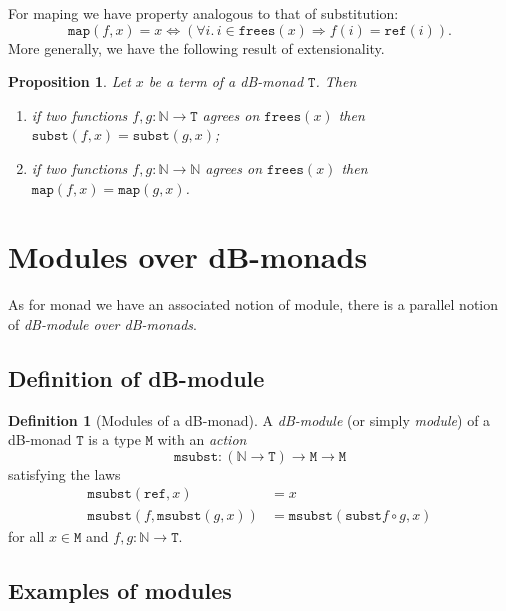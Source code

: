 \documentclass[a4paper,twoside,12pt]{article}
\newtheorem{proposition}{Proposition}
\theoremstyle{definition}
\newtheorem{definition}{Definition}
\theoremstyle{remark}
\theoremstyle{example}
\newcommand{\NN}{\mathbb{N}}
\newcommand{\TT}{\mathtt{T}}
\newcommand{\MM}{\mathtt{M}}
\newcommand{\subst}{\mathtt{subst}}
\newcommand{\refe}{\mathtt{ref}}
\newcommand{\frees}{\mathtt{frees}}
\newcommand{\map}{\mathtt{map}}
\newcommand{\msubst}{\mathtt{msubst}}
\begin{document}
For maping we have property analogous to that of substitution:
\begin{equation*}
  \map(f,x) = x \Longleftrightarrow
  (\forall i.\, i \in \mathtt{frees}(x) \Longrightarrow f(i) = \refe(i)).
\end{equation*}
More generally, we have the following result of extensionality.
\begin{proposition}
  Let $x$ be a term of a dB-monad $\TT$.  Then
  \begin{enumerate}
  \item if two functions $f,g\colon \NN\to \TT$ agrees on $\frees(x)$
    then $\subst(f,x) = \subst(g,x)$;
  \item if two functions $f,g\colon \NN\to \NN$ agrees on $\frees(x)$
    then $\map(f,x) = \map(g,x)$.
  \end{enumerate}
\end{proposition}

\section{Modules over dB-monads}
\label{sec:modules}

As for monad we have an associated notion of module, there is a
parallel notion of \emph{dB-module over dB-monads}.

\subsection{Definition of dB-module}
\label{sec:definition-module}

\begin{definition}[Modules of a dB-monad]
  A \emph{dB-module} (or simply \emph{module}) of a dB-monad $\TT$ is
  a type $\MM$ with an \emph{action}
  \begin{equation*}
    \msubst\colon (\NN\to \TT) \to \MM \to \MM
  \end{equation*}
  satisfying the laws
  \begin{align*}
    \msubst(\refe,x) &= x\\
    \msubst(f,\msubst(g,x)) &= \msubst(\subst f \circ g, x)
  \end{align*}
  for all $x\in \MM$ and $f,g\colon \NN \to \TT$.
\end{definition}

\subsection{Examples of modules}
\label{sec:examples-modules}
\end{document}
